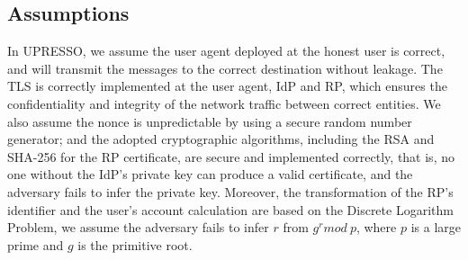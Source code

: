 \subsection{Assumptions}
In UPRESSO, we assume the user agent deployed at the honest user is correct,
and will transmit the messages to the correct destination without leakage.
The TLS is correctly implemented at the user agent, IdP and RP, which ensures the confidentiality and integrity of the network traffic between correct entities.
We also assume the nonce is unpredictable by using  a secure random number generator;
and the adopted cryptographic algorithms, including the RSA and SHA-256 for the RP certificate, are secure and implemented correctly, that is, no one without the IdP's private key can produce a valid certificate,
and the adversary fails to infer the private key.
Moreover, the transformation of the RP's identifier and the user's account calculation are based on the Discrete Logarithm Problem,
we assume the adversary fails to infer $r$ from $g^r mod\ p$, where $p$ is a large prime and $g$ is the primitive root.







